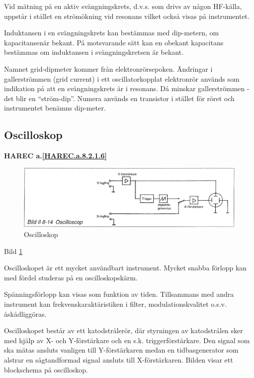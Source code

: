Vid mätning på en aktiv svängningskrets, d.v.s. som drivs av någon
HF-källa, uppstår i stället en strömökning vid resonans vilket också
visas på instrumentet.

Induktansen i en svängningskrets kan bestämmas med dip-metern, om
kapacitansenär bekant. På motsvarande sätt kan en obekant kapacitans
bestämmas om induktansen i svängningskretsen är bekant.

Namnet grid-dipmeter kommer från elektronrörsepoken. Ändringar i
gallerströmmen (grid current) i ett oscillatorkopplat elektronrör
används som indikation på att en svängningskrets är i resonans. Då
minskar gallerströmmen - det blir en ``ström-dip''.  Numera används en
transistor i stället för röret och instrumentet benämns dip-meter.

\subsection{Oscilloskop}
\textbf{
HAREC a.\ref{HAREC.a.8.2.1.6}\label{myHAREC.a.8.2.1.6}
}

\begin{rev-omarbetas}
\begin{figure}
  \includegraphics[width=\textwidth]{images/bild_2_8-14}
  \caption{Oscilloskop}
  \label{fig:bildII8-14}
\end{figure}

Bild \ref{fig:bildII8-14}

Oscilloskopet är ett mycket användbart instrument. Mycket snabba
förlopp kan med fördel studeras på en oscilloskopskärm.

Spänningsförlopp kan visas som funktion av tiden. Tillsammans med
andra instrument kan frekvenskaraktäristiken i filter,
modulationskvalitet o.s.v. åskådliggöras.

Oscilloskopet består av ett katodstrålerör, där styrningen av
katodstrålen sker med hjälp av X- och Y-förstärkare och en s.k.
triggerförstärkare. Den signal som ska mätas ansluts vanligen till
Y-förstärkaren medan en tidbasgenerator som alstrar en sågtandformad
signal ansluts till X-förstärkaren.  Bilden visar ett blockschema på
oscilloskop.
\end{rev-omarbetas}


